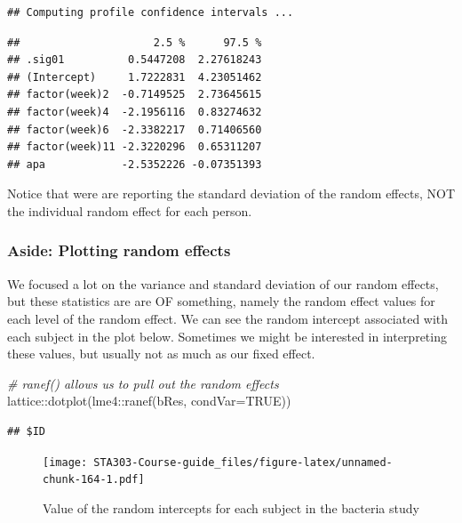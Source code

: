 \documentclass[
  openany]{book}
\newenvironment{Shaded}{\begin{snugshade}}{\end{snugshade}}
\newcommand{\AttributeTok}[1]{\textcolor[rgb]{0.77,0.63,0.00}{#1}}
\newcommand{\CommentTok}[1]{\textcolor[rgb]{0.56,0.35,0.01}{\textit{#1}}}
\newcommand{\ConstantTok}[1]{\textcolor[rgb]{0.00,0.00,0.00}{#1}}
\newcommand{\FunctionTok}[1]{\textcolor[rgb]{0.00,0.00,0.00}{#1}}
\newcommand{\NormalTok}[1]{#1}
\newcommand{\SpecialCharTok}[1]{\textcolor[rgb]{0.00,0.00,0.00}{#1}}
\begin{document}
\begin{verbatim}
## Computing profile confidence intervals ...
\end{verbatim}

\begin{verbatim}
##                     2.5 %      97.5 %
## .sig01          0.5447208  2.27618243
## (Intercept)     1.7222831  4.23051462
## factor(week)2  -0.7149525  2.73645615
## factor(week)4  -2.1956116  0.83274632
## factor(week)6  -2.3382217  0.71406560
## factor(week)11 -2.3220296  0.65311207
## apa            -2.5352226 -0.07351393
\end{verbatim}

Notice that were are reporting the standard deviation of the random effects, NOT the individual random effect for each person.

\hypertarget{aside-plotting-random-effects}{%
\subsubsection{Aside: Plotting random effects}\label{aside-plotting-random-effects}}

We focused a lot on the variance and standard deviation of our random effects, but these statistics are are OF something, namely the random effect values for each level of the random effect. We can see the random intercept associated with each subject in the plot below. Sometimes we might be interested in interpreting these values, but usually not as much as our fixed effect.

\begin{Shaded}
\begin{Highlighting}[]
\CommentTok{\# ranef() allows us to pull out the random effects}
\NormalTok{lattice}\SpecialCharTok{::}\FunctionTok{dotplot}\NormalTok{(lme4}\SpecialCharTok{::}\FunctionTok{ranef}\NormalTok{(bRes, }\AttributeTok{condVar=}\ConstantTok{TRUE}\NormalTok{)) }
\end{Highlighting}
\end{Shaded}

\begin{verbatim}
## $ID
\end{verbatim}

\begin{figure}
\centering
\texttt{[image: STA303-Course-guide\_files/figure-latex/unnamed-chunk-164-1.pdf]}
\caption{\label{fig:unnamed-chunk-164}Value of the random intercepts for each subject in the bacteria study}
\end{figure}
\end{document}
